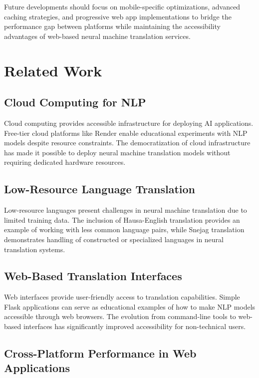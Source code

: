 \documentclass[conference]{IEEEtran}
\begin{document}
Future developments should focus on mobile-specific optimizations, advanced caching strategies, and progressive web app implementations to bridge the performance gap between platforms while maintaining the accessibility advantages of web-based neural machine translation services.

\section{Related Work}

\subsection{Cloud Computing for NLP}

Cloud computing provides accessible infrastructure for deploying AI applications. Free-tier cloud platforms like Render enable educational experiments with NLP models despite resource constraints. The democratization of cloud infrastructure has made it possible to deploy neural machine translation models without requiring dedicated hardware resources.

\subsection{Low-Resource Language Translation}

Low-resource languages present challenges in neural machine translation due to limited training data. The inclusion of Hausa-English translation provides an example of working with less common language pairs, while Snejag translation demonstrates handling of constructed or specialized languages in neural translation systems.

\subsection{Web-Based Translation Interfaces}

Web interfaces provide user-friendly access to translation capabilities. Simple Flask applications can serve as educational examples of how to make NLP models accessible through web browsers. The evolution from command-line tools to web-based interfaces has significantly improved accessibility for non-technical users.

\subsection{Cross-Platform Performance in Web Applications}
\end{document}
